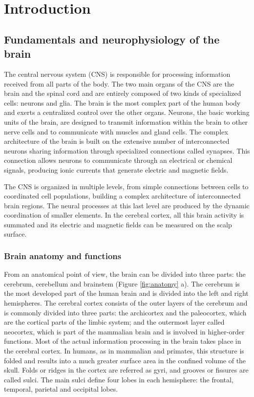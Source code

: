 
\chapter{Introduction}

\section{Fundamentals and neurophysiology of the brain}

The central nervous system (CNS) is responsible for processing information received from all parts of the body. The two main organs of the CNS are the brain and the spinal cord and are entirely composed of two kinds of specialized cells: neurons and glia. The brain is the most complex part of the human body and exerts a centralized control over the other organs. Neurons, the basic working units of the brain, are designed to transmit information within the brain to other nerve cells and to communicate with muscles and gland cells. The complex architecture of the brain is built on the extensive number of interconnected neurons sharing information through specialized connections called synapses. This connection allows  neurons to communicate through an electrical or chemical signals, producing ionic currents that generate electric and magnetic fields. 

The CNS is organized in multiple levels, from simple connections between cells to coordinated cell populations, building a complex architecture of interconnected brain regions. The neural processes at this last level are produced by the dynamic coordination of smaller elements. In the cerebral cortex, all this brain activity is summated and its electric and magnetic fields can be measured on the scalp surface. 

\subsection{Brain anatomy and functions} %
From an anatomical point of view, the brain can be divided into three parts: the cerebrum, cerebellum and brainstem (Figure \ref{fig:anatomy} a). The cerebrum is the most developed part of the human brain and is divided into the left and right hemispheres. The cerebral cortex consists of the outer layers of the cerebrum and is commonly divided into three parts: the archicortex and the paleocortex, which are the cortical parts of the limbic system; and the outermost layer called neocortex, which is part of the mammalian brain and is involved in higher-order functions. Most of the actual information processing in the brain takes place in the cerebral cortex. In humans, as in mammalian and primates, this structure is folded and results into a much greater surface area in the confined volume of the skull. Folds or ridges in the cortex are referred as gyri, and grooves or fissures are called sulci. The main sulci define four lobes in each hemisphere: the frontal, temporal, parietal and occipital lobes. 

